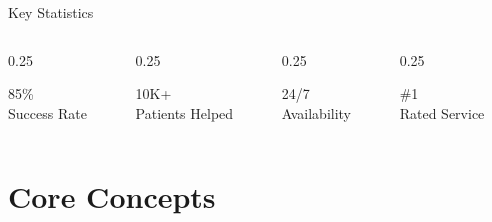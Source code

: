 \documentclass[aspectratio=169]{beamer}
\begin{document}
\begin{frame}{Key Statistics}
    \begin{columns}[T]
        \begin{column}{0.25\textwidth}
            \begin{center}
                \textcolor{BrandPrimary}{\Huge 85\%}\\
                \small Success Rate
            \end{center}
        \end{column}
        \begin{column}{0.25\textwidth}
            \begin{center}
                \textcolor{BrandSecondary}{\Huge 10K+}\\
                \small Patients Helped
            \end{center}
        \end{column}
        \begin{column}{0.25\textwidth}
            \begin{center}
                \textcolor{BrandAccent}{\Huge 24/7}\\
                \small Availability
            \end{center}
        \end{column}
        \begin{column}{0.25\textwidth}
            \begin{center}
                \textcolor{BrandPrimary}{\Huge \#1}\\
                \small Rated Service
            \end{center}
        \end{column}
    \end{columns}
\end{frame}

\section{Core Concepts}
\end{document}
